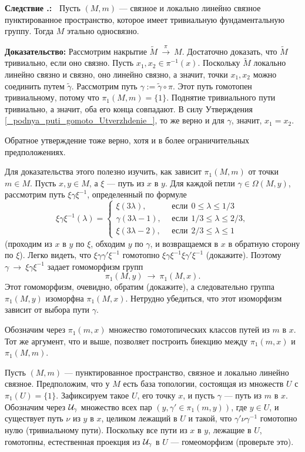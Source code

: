 \documentclass[12pt]{book}
\newcommand{\arrow}{{\:\longrightarrow\:}}
\def\endproof{\hbox{\vrule width 5pt height 5pt depth 0pt}}
\theoremstyle{upshape}
\theoremstyle{generic}
\theoremstyle{upshapenonumber}
\newcommand{\следствие}{%
     \refstepcounter{teorema}
     {\noindent\bf Следствие \thechapter.\arabic{teorema}:\ }}
\newcommand{\пример}{%
     \refstepcounter{teorema}
     {\noindent\bf Пример \thechapter.\arabic{teorema}:\ }}
\newcommand{\лемма}{%
     \refstepcounter{teorema}
     {\noindent\bf Лемма \thechapter.\arabic{teorema}:\ }}
\newcommand{\теорема}{%
     \refstepcounter{teorema}
     {\noindent\bf Теорема \thechapter.\arabic{teorema}:\ }}
\newcommand{\утверждение}{%
     \refstepcounter{teorema}
     {\noindent\bf Утверждение \thechapter.\arabic{teorema}:\ }}
\def\хфилл{\hfill}
\def\ноиндент{\noindent}
\def\бф{\bf}
\begin{document}
\хфилл

\следствие
Пусть $(M,m)$ --- связное и локально линейно связное
пунктированное пространство, которое 
имеет тривиальную фундаментальную группу.
Тогда $M$ этально односвязно.

\хфилл

\ноиндент
{\бф Доказательство:} 
Рассмотрим накрытие $\tilde M \stackrel \pi \arrow M$.
Достаточно доказать, что $\tilde M$ тривиально,
если оно связно. Пусть
$x_1, x_2 \in \pi^{-1}(x)$. Поскольку $\tilde M$
локально линейно связно и связно, оно линейно
связно, а значит, точки $x_1, x_2$ можно соединить
путем $\tilde \gamma$. Рассмотрим путь
$\gamma:= \tilde\gamma\circ \pi$.
Этот путь гомотопен тривиальному, 
потому что $\pi_1(M,m)=\{1\}$. 
Поднятие тривиального пути тривиально,
а значит, оба его конца совпадают.
В силу Утверждения \ref{_podnya_puti_gomoto_Utverzhdenie_},
то же верно и для $\gamma$, значит, $x_1=x_2$.
\endproof

\хфилл

Обратное утверждение тоже верно, хотя и в более
ограничительных предположениях.

Для доказательства этого полезно
изучить, как зависит $\pi_1(M,m)$
от точки $m\in M$. Пусть $x, y\in M$,
а $\xi$ --- путь из $x$ в $y$. 
Для каждой петли $\gamma\in \Omega(M,y)$,
рассмотрим путь $\xi \gamma\xi^{-1}$, определенный
по формуле 
\[
\xi \gamma\xi^{-1}(\lambda) = \begin{cases} 
\xi(3\lambda), & \ \ \text{если} \ \ 0\leq\lambda\leq 1/3\\
\gamma(3\lambda-1), &\ \ \text{если} \ \ 1/3\leq\lambda\leq 2/3,\\
\xi(3\lambda-2), &\ \ \text{если} \ \ 2/3\leq\lambda\leq 1
\end{cases}
\]
(проходим из $x$ в $y$ по $\xi$, обходим $y$ по $\gamma$,
и возвращаемся в $x$ в обратную сторону по $\xi$).
Легко видеть, что $\xi \gamma\gamma'\xi^{-1}$ 
гомотопно $\xi \gamma\xi^{-1}\xi\gamma'\xi^{-1}$ 
(докажите). Поэтому $\gamma \arrow \xi \gamma\xi^{-1}$
задает гомоморфизм групп \[ \pi_1(M,y) \arrow \pi_1(M,x).\]
Этот гомоморфизм, очевидно, обратим (докажите), а следовательно
группа $\pi_1(M,y)$ изоморфна $\pi_1(M,x)$. 
Нетрудно убедиться, что этот изоморфизм зависит
от выбора пути $\gamma$.

Обозначим через $\pi_1(m,x)$ множество гомотопических
классов путей из $m$ в $x$. Тот же аргумент, что и выше,
позволяет построить биекцию между $\pi_1(m,x)$ и
$\pi_1(M,m)$.


Пусть $(M,m)$ --- пунктированное пространство,
связное и локально линейно связное.
Предположим, что у $M$ есть база топологии,
состоящая из множеств $U$ с $\pi_1(U)=\{1\}$.
Зафиксируем такое $U$, его точку $x$, и
пусть $\gamma$ --- путь из $m$ в $x$.
Обозначим через ${\cal U}_\gamma$ множество
всех пар $(y, \gamma' \in \pi_1(m,y))$,
где $y\in U$, и существует путь
$\nu$ из $y$ в $x$, целиком лежащий
в $U$ и такой, что $\gamma'\nu\gamma^{-1}$
гомотопно нулю (тривиальному пути).
Поскольку все пути из $x$ в $y$, лежащие
в $U$, гомотопны, естественная
проекция из ${\cal U}_\gamma$ в $U$ --- гомеоморфизм
(проверьте это).
\end{document}

